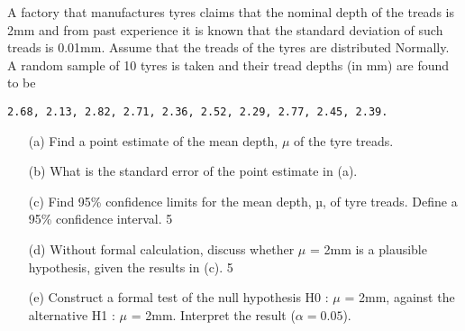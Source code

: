 \documentclass[12pt, a4paper]{report}
\theoremstyle{definition}
\theoremstyle{remark}
\begin{document}

A factory that manufactures tyres claims that the nominal depth of the treads is 2mm and from past experience it is known that the standard deviation of such treads is 0.01mm. Assume that the treads of the tyres are distributed Normally. A random sample of 10 tyres is taken and their tread depths (in mm) are found to be 

\begin{verbatim} 
2.68, 2.13, 2.82, 2.71, 2.36, 2.52, 2.29, 2.77, 2.45, 2.39.
\end{verbatim} 
\begin{itemize} 
\item[(a)] Find a point estimate of the mean depth, $\mu$ of the tyre treads. 	
 
\item[(b)] What is the standard error of the point estimate in (a). 			
 
\item[(c)] Find 95\% confidence limits for the mean depth, µ, of tyre treads. Define a 95\%  confidence interval. 						5
 
\item[(d)] Without formal calculation, discuss whether $\mu$ = 2mm is a plausible  hypothesis,   given the results in (c). 						5
 
\item[(e)] Construct a formal test of the null hypothesis 
H0 : $\mu$ = 2mm, against the alternative  H1 : $\mu$ = 2mm. Interpret the result ($\alpha = 0.05$).		 										
 
 \end{itemize}
 
\end{document}
